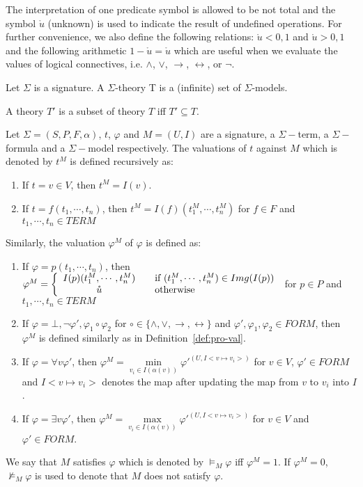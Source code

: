 The interpretation of one predicate symbol is allowed to be not total and the symbol $\mathring{u}$ (unknown) is used to indicate the result of undefined operations. For further convenience, we also define the following relations: $\mathring{u} < 0, 1$ and $\mathring{u} > 0, 1$ and the following arithmetic $1 - \mathring{u} = \mathring{u}$ which are useful when we evaluate the values of logical connectives, i.e. $\wedge$, $\vee$, $\rightarrow$, $\leftrightarrow$, or $\neg$. 

\begin{definition}
Let $\Sigma$ is a signature. A $\Sigma$-theory T is a (infinite) set of $\Sigma$-models.
\end{definition}
A theory $T'$ is a subset of theory $T$ iff $T' \subseteq T$.

\begin{definition}
Let $\Sigma = (S, P, F, \alpha)$, $t$, $\varphi$ and $M=(U, I)$ are a signature, a $\Sigma-$term, a $\Sigma-$formula and a $\Sigma-$model respectively. The valuations of $t$ against $M$ which is denoted by $t^M$ is defined recursively as:
\begin{enumerate}
\item If $t = v \in V$, then $t^M = I(v)$.
\item If $t = f(t_1, \cdots, t_n)$, then $t^M = I(f)(t_1^M, \cdots, t_n^M)$ for $f \in F$ and $t_1,\cdots, t_n \in TERM$
\end{enumerate}
Similarly, the valuation $\varphi^M$ of $\varphi$ is defined as:
\begin{enumerate}
\item If $\varphi = p(t_1,\cdots,t_n)$, then $\varphi^M = \left\{ 
  \begin{array}{c l}
    I(p)(t_1^M,\cdots,t_n^M) & \quad \text{if } (t_1^M, \cdots, t_n^M) \in Img(I(p))\\
    \mathring{u} & \quad \text{otherwise }\\
  \end{array} \right.$ for $p \in P$ and $t_1,\cdots, t_n \in TERM$
\item If $\varphi = \bot, \neg\varphi', \varphi_1 \circ \varphi_2$ for $\circ \in \{\wedge, \vee, \rightarrow, \leftrightarrow\}$ and $\varphi', \varphi_1, \varphi_2 \in FORM$, then $\varphi^M$ is defined similarly as in Definition~\ref{def:pro-val}.
\item If $\varphi = \forall v \varphi'$, then $\varphi^M = \min\limits_{v_i \in I(\alpha(v))}\varphi'^{(U, I<v \mapsto v_i>)}$ for $v \in V$,  $\varphi' \in FORM$ and $I<v \mapsto v_i>$ denotes the map after updating the map from $v$ to $v_i$ into $I$.
\item If $\varphi = \exists v \varphi'$, then $\varphi^M = \max\limits_{v_i \in I(\alpha(v))}\varphi'^{(U, I<v \mapsto v_i>)}$ for $v \in V$ and  $\varphi' \in FORM$.
\end{enumerate}
We say that $M$ satisfies $\varphi$ which is denoted by $\models_M \varphi$ iff $\varphi^M = 1$. If $\varphi^M = 0$, $\not\models_M \varphi$ is used to denote that $M$ does not satisfy $\varphi$.
\end{definition}

